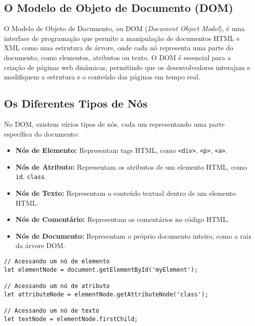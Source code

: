 \subsection{O Modelo de Objeto de Documento (DOM)}
O Modelo de Objeto de Documento, ou DOM (\textit{Document Object Model}), é uma interface de programação que permite a manipulação de documentos HTML e XML como uma estrutura de árvore, onde cada nó representa uma parte do documento, como elementos, atributos ou texto. O DOM é essencial para a criação de páginas web dinâmicas, permitindo que os desenvolvedores interajam e modifiquem a estrutura e o conteúdo das páginas em tempo real.


\subsection{Os Diferentes Tipos de Nós}
No DOM, existem vários tipos de nós, cada um representando uma parte específica do documento:

\begin{itemize}
    \item \textbf{Nós de Elemento:} Representam tags HTML, como \texttt{<div>}, \texttt{<p>}, \texttt{<a>}.
    \item \textbf{Nós de Atributo:} Representam os atributos de um elemento HTML, como \texttt{id}, \texttt{class}.
    \item \textbf{Nós de Texto:} Representam o conteúdo textual dentro de um elemento HTML.
    \item \textbf{Nós de Comentário:} Representam os comentários no código HTML.
    \item \textbf{Nós de Documento:} Representam o próprio documento inteiro, como a raiz da árvore DOM.
\end{itemize}


\begin{verbatim}
// Acessando um nó de elemento
let elementNode = document.getElementById('myElement');

// Acessando um nó de atributo
let attributeNode = elementNode.getAttributeNode('class');

// Acessando um nó de texto
let textNode = elementNode.firstChild;
\end{verbatim}

